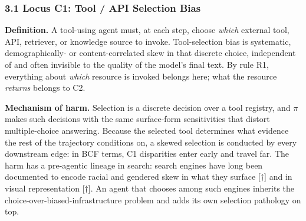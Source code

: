 \documentclass[10pt]{article}
\begin{document}
\subsubsection*{3.1 Locus C1: Tool / API Selection Bias}

\textbf{Definition.} A tool-using agent must, at each step, choose \emph{which} external tool, API, retriever, or knowledge source to invoke. Tool-selection bias is systematic, demographically- or content-correlated skew in that discrete choice, independent of and often invisible to the quality of the model's final text. By rule R1, everything about \emph{which} resource is invoked belongs here; what the resource \emph{returns} belongs to C2.

\textbf{Mechanism of harm.} Selection is a discrete decision over a tool registry, and $\pi$ makes such decisions with the same surface-form sensitivities that distort multiple-choice answering. Because the selected tool determines what evidence the rest of the trajectory conditions on, a skewed selection is conducted by every downstream edge: in BCF terms, C1 disparities enter early and travel far. The harm has a pre-agentic lineage in search: search engines have long been documented to encode racial and gendered skew in what they surface \cite{u2018algorithms}[$\dagger$] and in visual representation \cite{makhortykh2021detecting}[$\dagger$]. An agent that chooses among such engines inherits the choice-over-biased-infrastructure problem and adds its own selection pathology on top.
\end{document}
